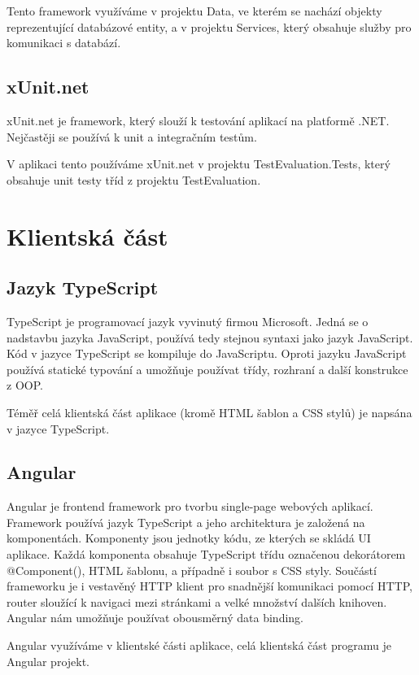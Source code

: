 Tento framework využíváme v projektu Data, ve kterém se nachází objekty reprezentující databázové entity, a v projektu Services, který obsahuje služby pro komunikaci s databází.

\subsection{xUnit.net}
xUnit.net je framework, který slouží k testování aplikací na platformě .NET. Nejčastěji se používá k unit a integračním testům. 
\cite{xUnitDocs}

V aplikaci tento používáme xUnit.net v projektu TestEvaluation.Tests, který obsahuje unit testy tříd z projektu TestEvaluation.

\section{Klientská část}

\subsection{Jazyk TypeScript}
TypeScript je programovací jazyk vyvinutý firmou Microsoft. Jedná se o nadstavbu jazyka JavaScript, používá tedy stejnou syntaxi jako jazyk JavaScript. Kód v jazyce TypeScript se kompiluje do JavaScriptu.
Oproti jazyku JavaScript používá statické typování a umožňuje používat třídy, rozhraní a další konstrukce z OOP. 
\cite{TypescriptDocs}

Téměř celá klientská část aplikace (kromě HTML šablon a CSS stylů) je napsána v jazyce TypeScript.

\subsection{Angular}
Angular je frontend framework pro tvorbu single-page webových aplikací. Framework používá jazyk TypeScript a jeho architektura je založená na komponentách.
Komponenty jsou jednotky kódu, ze kterých se skládá UI aplikace. Každá komponenta obsahuje TypeScript třídu označenou dekorátorem @Component(), HTML šablonu, a případně i soubor s CSS styly. 
Součástí frameworku je i vestavěný HTTP klient pro snadnější komunikaci pomocí HTTP, router sloužící k navigaci mezi stránkami a velké množství dalších knihoven. Angular nám umožňuje používat obousměrný data binding.
\cite{AngularDocs}

Angular využíváme v klientské části aplikace, celá klientská část programu je Angular projekt.

